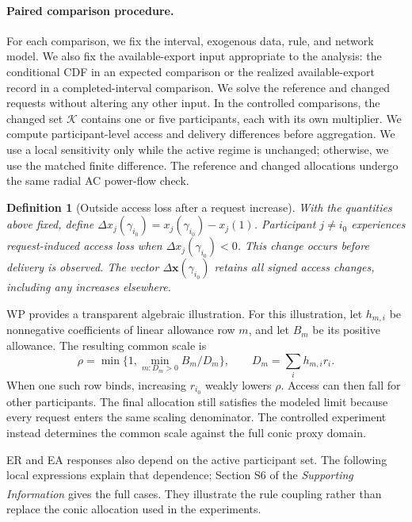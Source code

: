 \documentclass[twoside,twocolumn,9pt]{article}
\newtheorem{definition}{Definition}[section]
\newcommand{\suppref}{\textit{Supporting Information}\textsuperscript{\dag}}
\begin{document}
{\paragraph{Paired comparison procedure.}
For each comparison, we fix the interval, exogenous data, rule, and network
model. We also fix the available-export input appropriate to the analysis: the
conditional CDF in an expected comparison or the realized available-export
record in a completed-interval comparison. We solve the reference and changed
requests without altering any other input. In the controlled comparisons, the
changed set $\mathcal K$ contains
one or five participants, each with its own multiplier. We compute participant-level
access and delivery differences before aggregation. We use a local sensitivity
only while the active regime is unchanged; otherwise, we use the matched finite
difference. The reference and changed allocations undergo the same radial AC
power-flow check.

\begin{definition}[Outside access loss after a request increase]
With the quantities above fixed, define
$\Delta x_j(\gamma_{i_0})=x_j(\gamma_{i_0})-x_j(1)$. Participant $j\ne i_0$
experiences request-induced access loss when $\Delta x_j(\gamma_{i_0})<0$.
This change occurs before delivery is observed. The vector
$\Delta\mathbf x(\gamma_{i_0})$ retains all signed access changes, including
any increases elsewhere.
\end{definition}

WP provides a transparent algebraic illustration. For this illustration, let
$h_{m,i}$ be nonnegative coefficients of linear allowance row $m$, and let $B_m$ be
its positive allowance. The resulting common scale is
\begin{equation*}
\rho=\min\{1,\min_{m:D_m>0}B_m/D_m\},\qquad
D_m=\sum_i h_{m,i}r_i.
\end{equation*}
When one such row binds, increasing $r_{i_0}$
weakly lowers $\rho$. Access can then fall for other participants. The final
allocation still satisfies the modeled limit because every request enters the
same scaling denominator. The controlled experiment instead determines the
common scale against the full conic proxy domain.

ER and EA responses also depend on the active participant set. The following
local expressions explain that dependence; Section S6 of the \suppref{}
gives the full cases. They illustrate the rule coupling rather than replace
the conic allocation used in the experiments.

}
\end{document}
